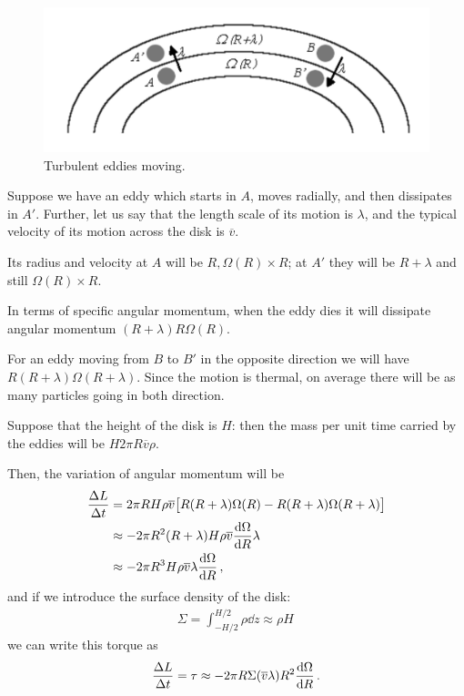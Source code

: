 \documentclass[main.tex]{subfiles}
\begin{document}
\begin{figure}[ht]
\centering
\includegraphics[width=\textwidth]{figures/turbulent-eddies-accretion}
\caption{Turbulent eddies moving.}
\label{fig:turbulent-eddies-accretion}
\end{figure}

Suppose we have an eddy which starts in \(A\), moves radially, and then dissipates in \(A'\).
Further, let us say that the length scale of its motion is \(\lambda \), and the typical velocity of its motion across the disk is \(\overline{v}\). 

Its radius and velocity at \(A\) will be \(R, \Omega(R) \times  R\); at \(A'\) they will be \(R + \lambda \) and still \(\Omega (R) \times R\). 

In terms of specific angular momentum, when the eddy dies it will dissipate angular momentum \((R+\lambda) R \Omega (R) \).

For an eddy moving from \(B\) to \(B'\) in the opposite direction we will have \(R (R + \lambda ) \Omega (R + \lambda )\). 
Since the motion is thermal, on average there will be as many particles going in both direction.


Suppose that the height of the disk is \(H\): then the mass per unit time carried by the eddies will be \(H 2 \pi R \overline{v} \rho \). 

Then, the variation of angular momentum will be 
%
\begin{align}
\frac{\Delta L}{\Delta t} &= 2 \pi R H \rho \overline{v} 
\qty[R (R + \lambda ) \Omega (R) - R (R+\lambda ) \Omega (R + \lambda )]  \\
&\approx - 2 \pi R^2 (R+ \lambda ) H \rho \overline{v} \dv{\Omega }{R} \lambda  \\
&\approx - 2\pi R^3 H \rho \overline{v} \lambda \dv{\Omega }{R}
\,,
\end{align}
%
and if we introduce the surface density of the disk: 
%
\begin{align}
\Sigma = \int_{- H/2 }^{H/2} \rho \dd{z} \approx \rho H
\,
\end{align}
%
we can write this torque as
%
\begin{align}
\frac{ \Delta L}{\Delta t} = \tau \approx -2 \pi R \Sigma \qty(\overline{v} \lambda ) R^2 \dv{\Omega }{R}
\,.
\end{align}
\end{document}
